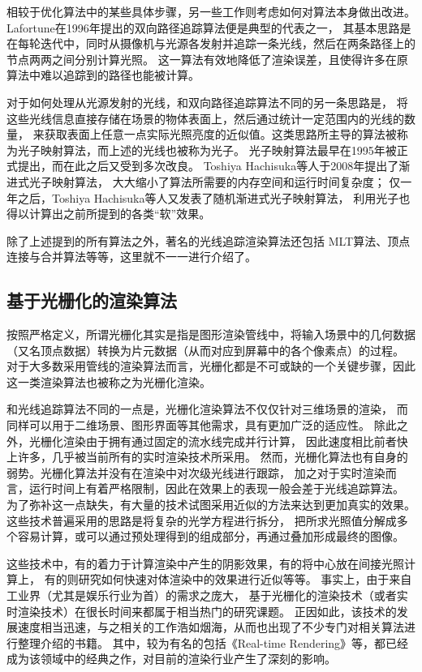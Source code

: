 相较于优化算法中的某些具体步骤，另一些工作则考虑如何对算法本身做出改进。
Lafortune在1996年提出的双向路径追踪算法\cite{lafortune1993bi}便是典型的代表之一，
其基本思路是在每轮迭代中，同时从摄像机与光源各发射并追踪一条光线，然后在两条路径上的节点两两之间分别计算光照。
这一算法有效地降低了渲染误差，且使得许多在原算法中难以追踪到的路径也能被计算。

对于如何处理从光源发射的光线，和双向路径追踪算法不同的另一条思路是，
将这些光线信息直接存储在场景的物体表面上，然后通过统计一定范围内的光线的数量，
来获取表面上任意一点实际光照亮度的近似值。这类思路所主导的算法被称为光子映射算法，而上述的光线也被称为光子。
光子映射算法最早在1995年被正式提出\cite{jensen1995photon}，而在此之后又受到多次改良。
Toshiya Hachisuka等人于2008年提出了渐进式光子映射算法\cite{hachisuka2008progressive}，
大大缩小了算法所需要的内存空间和运行时间复杂度；
仅一年之后，Toshiya Hachisuka等人又发表了随机渐进式光子映射算法\cite{hachisuka2009stochastic}，
利用光子也得以计算出之前所提到的各类“软”效果。

除了上述提到的所有算法之外，著名的光线追踪渲染算法还包括
MLT算法、顶点连接与合并算法等等，这里就不一一进行介绍了。


\subsection{基于光栅化的渲染算法}

按照严格定义，所谓光栅化其实是指是图形渲染管线中，将输入场景中的几何数据（又名顶点数据）转换为片元数据（从而对应到屏幕中的各个像素点）的过程。
对于大多数采用管线的渲染算法而言，光栅化都是不可或缺的一个关键步骤，因此这一类渲染算法也被称之为光栅化渲染。

和光线追踪算法不同的一点是，光栅化渲染算法不仅仅针对三维场景的渲染，
而同样可以用于二维场景、图形界面等其他需求，具有更加广泛的适应性。
除此之外，光栅化渲染由于拥有通过固定的流水线完成并行计算，
因此速度相比前者快上许多，几乎被当前所有的实时渲染技术所采用。
然而，光栅化算法也有自身的弱势。光栅化算法并没有在渲染中对次级光线进行跟踪，
加之对于实时渲染而言，运行时间上有着严格限制，因此在效果上的表现一般会差于光线追踪算法。
为了弥补这一点缺失，有大量的技术试图采用近似的方法来达到更加真实的效果。
这些技术普遍采用的思路是将复杂的光学方程进行拆分，
把所求光照值分解成多个容易计算，或可以通过预处理得到的组成部分，再通过叠加形成最终的图像。

这些技术中，有的着力于计算渲染中产生的阴影效果，有的将中心放在间接光照计算上，
有的则研究如何快速对体渲染中的效果进行近似等等。
事实上，由于来自工业界（尤其是娱乐行业为首）的需求之庞大，
基于光栅化的渲染技术（或者实时渲染技术）在很长时间来都属于相当热门的研究课题。
正因如此，该技术的发展速度相当迅速，与之相关的工作浩如烟海，从而也出现了不少专门对相关算法进行整理介绍的书籍。
其中，较为有名的包括《Real-time Rendering》\cite{RTR4}等，都已经成为该领域中的经典之作，对目前的渲染行业产生了深刻的影响。


